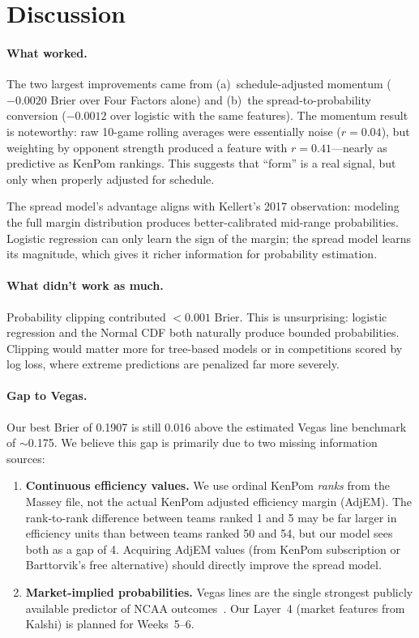 \documentclass[11pt,a4paper]{article}
\begin{document}
\section{Discussion}

\paragraph{What worked.} The two largest improvements came from (a)~schedule-adjusted momentum ($-0.0020$ Brier over Four Factors alone) and (b)~the spread-to-probability conversion ($-0.0012$ over logistic with the same features). The momentum result is noteworthy: raw 10-game rolling averages were essentially noise ($r = 0.04$), but weighting by opponent strength produced a feature with $r = 0.41$---nearly as predictive as KenPom rankings. This suggests that ``form'' is a real signal, but only when properly adjusted for schedule.

The spread model's advantage aligns with Kellert's 2017 observation: modeling the full margin distribution produces better-calibrated mid-range probabilities. Logistic regression can only learn the sign of the margin; the spread model learns its magnitude, which gives it richer information for probability estimation.

\paragraph{What didn't work as much.} Probability clipping contributed $< 0.001$ Brier. This is unsurprising: logistic regression and the Normal CDF both naturally produce bounded probabilities. Clipping would matter more for tree-based models or in competitions scored by log loss, where extreme predictions are penalized far more severely.

\paragraph{Gap to Vegas.} Our best Brier of 0.1907 is still 0.016 above the estimated Vegas line benchmark of $\sim$0.175. We believe this gap is primarily due to two missing information sources:
\begin{enumerate}[nosep]
    \item \textbf{Continuous efficiency values.} We use ordinal KenPom \textit{ranks} from the Massey file, not the actual KenPom adjusted efficiency margin (AdjEM). The rank-to-rank difference between teams ranked 1 and 5 may be far larger in efficiency units than between teams ranked 50 and 54, but our model sees both as a gap of 4. Acquiring AdjEM values (from KenPom subscription or Barttorvik's free alternative) should directly improve the spread model.
    \item \textbf{Market-implied probabilities.} Vegas lines are the single strongest publicly available predictor of NCAA outcomes~\citep{pomeroy2004}. Our Layer~4 (market features from Kalshi) is planned for Weeks~5--6.
\end{enumerate}
\end{document}
